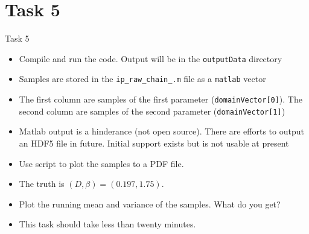\section{Task 5}
\begin{frame}[fragile]{Task 5}
  \begin{itemize}
    \item Compile and run the code.  Output will be in the \texttt{outputData} directory
    \item Samples are stored in the \texttt{ip\_raw\_chain\_.m} file as a
      \texttt{matlab} vector
    \item The first column are samples of the first parameter
      (\texttt{domainVector[0]}).  The second column are samples of the second
      parameter (\texttt{domainVector[1]})
    \item Matlab output is a hinderance (not open source).  There are efforts
      to output an HDF5 file in future.  Initial support exists but is not
      usable at present
    \item Use script to plot the samples to a PDF file.
    \item The truth is $(D, \beta) = (0.197, 1.75)$.
    \item Plot the running mean and variance of the samples.  What do you get?
    \item This task should take less than twenty minutes.
  \end{itemize}
\end{frame}
